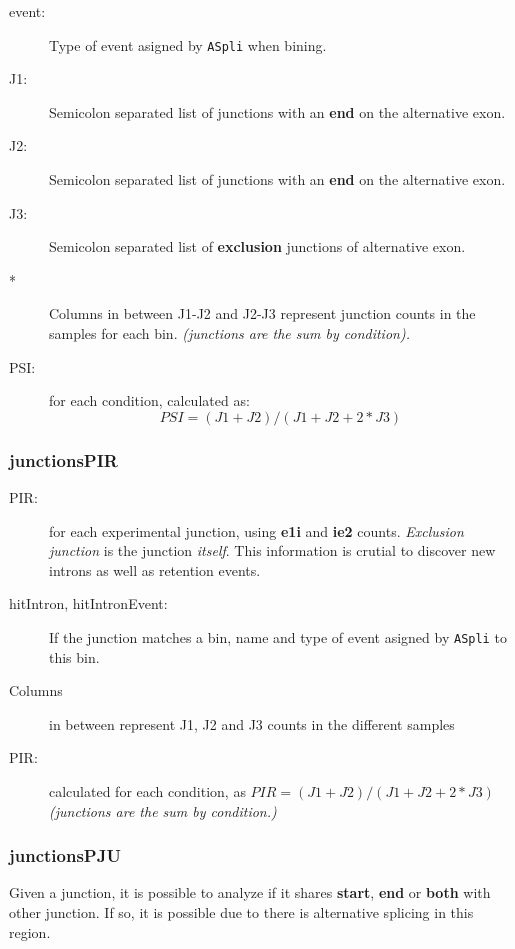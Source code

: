 \documentclass{article}
\begin{document}
\begin{description}
\item [event:] Type of event asigned by \texttt{ASpli} when bining. 
\item [J1:] Semicolon separated list of junctions with an \textbf{end} on the alternative exon. 
\item [J2:] Semicolon separated list of junctions with an \textbf{end} on the alternative exon. 
\item [J3:] Semicolon separated list of \textbf{exclusion} junctions of alternative exon. 

\item [*] Columns in between J1-J2 and J2-J3 represent junction counts in the samples for each bin. \textit{(junctions are the sum by condition).}

\item [PSI:] for each condition, calculated as: $$ PSI = (J1 + J2)/(J1 + J2 + 2*J3) $$ 
\end{description}

\subsubsection*{junctionsPIR}
\begin{description}
\item [PIR:] for each experimental junction, using \textbf{e1i} and \textbf{ie2} counts. \textit{Exclusion junction} is the junction \textit{itself}. This information is crutial to discover new introns as well as retention events. 
\item [hitIntron, hitIntronEvent:] If the junction matches a bin, name and type of event asigned by \texttt{ASpli} to this bin. 
\item [Columns] in between represent J1, J2 and J3 counts in the different samples 
\item [PIR:] calculated for each condition, as $ PIR = (J1 + J2)/(J1 + J2 + 2*J3) $ \textit{(junctions are the sum by condition.)}
\end{description}

\subsubsection*{junctionsPJU}
Given a junction, it is possible to analyze if it shares \textbf{start}, \textbf{end} or \textbf{both} with other junction. If so, it is possible due to there is alternative splicing in this region. 
\end{document}

